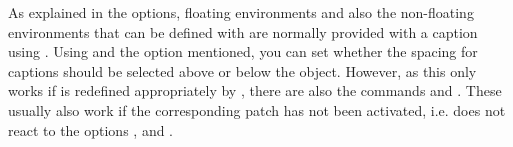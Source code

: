 \begin{Declaration}
\end{Declaration}%
As explained in the  options,
floating environments and also the non-floating environments that can be
defined with  are normally provided with
a caption using . Using  and the option
mentioned, you can set whether the spacing for captions should be selected
above or below the object. However, as this only works if  is
redefined appropriately by , there are also the commands
 and . These usually also work if the
corresponding patch has not been activated, i.e.  does not
react to the options ,  and
.
%
